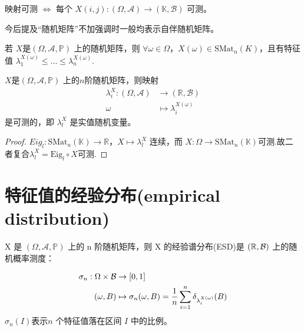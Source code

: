 \begin{remark}
    映射可测 \(\Leftrightarrow\) 每个 \(X(i,j): (\Omega, \mathcal{A}) \to (\mathbb{K}, \mathcal{B})\) 可测。

    今后提及“随机矩阵”不加强调时一般均表示自伴随机矩阵。
\end{remark}
若 \(X \)是\( (\Omega,\mathcal{A},\mathbb{P})\) 上的随机矩阵，则 \(\forall \omega \in \Omega\)，\(X(\omega) \in \text{SMat}_n(K)\)，且有特征值
\(\lambda_1^{X(\omega)} \leq \ldots \leq \lambda_n^{X(\omega)}\).
\begin{lemma}
     \(X \)是\( (\Omega,\mathcal{A},\mathbb{P})\) 上的$n$阶随机矩阵，则映射
\begin{equation*}
\begin{aligned}
    \lambda_i^X : (\Omega, \mathcal{A}) &\to (\mathbb{R}, \mathcal{B})\\
    \omega &\mapsto \lambda_i^{X(\omega)}
\end{aligned}
\end{equation*}
是可测的，即 \(\lambda_l^X\) 是实值随机变量。
\end{lemma}
\begin{proof}
    
\(Eig_l: \text{SMat}_n(\mathbb{K}) \to \mathbb{R}\)，\(X \mapsto \lambda_l^X\) 连续，而
\(X : \Omega \to \text{SMat}_n(\mathbb{K}) \)可测.故二者复合$\lambda_l^X = \text{Eig}_l \circ X $可测.

\end{proof}

\section{特征值的经验分布(empirical distribution)}
\begin{definition}
   X 是 \((\Omega, \mathcal{A}, \mathbb{P})\) 上的 n 阶随机矩阵，则 X 的经验谱分布(ESD)是 \((\mathbb{R}, \mathcal{B})\) 上的随机概率测度：

\begin{equation*}
\begin{aligned}
    \sigma_n : \Omega \times \mathcal{B} &\to [0, 1]\\
    (\omega, B) &\mapsto\sigma_n (\omega, B) = \frac{1}{n} \sum_{i=1}^n \delta_{\lambda_i^{X(\omega)}} (B)
\end{aligned}
\end{equation*}
\(\sigma_n(I)\)表示$n$ 个特征值落在区间 $I$ 中的比例。 
\end{definition}

